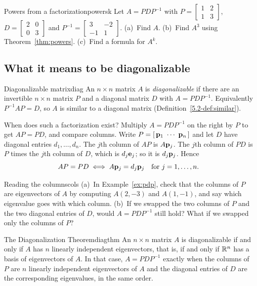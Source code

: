 \documentclass[11pt]{article}
\begin{document}
\begin{kc}{Powers from a factorization}{powersk}
Let $A=PDP^{-1}$ with $P=\begin{bmatrix}1&2\\1&3\end{bmatrix}$, $D=\begin{bmatrix}2&0\\0&3\end{bmatrix}$ and $P^{-1}=\begin{bmatrix}3&-2\\-1&1\end{bmatrix}$. (a)~Find $A$. (b)~Find $A^3$ using Theorem~\ref{thm:powers}. (c)~Find a formula for $A^k$.
\end{kc}

\subsection*{What it means to be diagonalizable}

\begin{defn}{Diagonalizable matrix}{diag}
An $n\times n$ matrix $A$ is \emph{diagonalizable} if there are an invertible $n\times n$ matrix $P$ and a diagonal matrix $D$ with $A=PDP^{-1}$. Equivalently $P^{-1}AP=D$, so $A$ is similar to a diagonal matrix (Definition~\ref{5.2-def:similar}).
\end{defn}

When does such a factorization exist? Multiply $A=PDP^{-1}$ on the right by $P$ to get $AP=PD$, and compare columns. Write $P=[\,\bv{p}_1\ \cdots\ \bv{p}_n\,]$ and let $D$ have diagonal entries $d_1,\dots,d_n$. The $j$th column of $AP$ is $A\mathbf{p}_j$. The $j$th column of $PD$ is $P$ times the $j$th column of $D$, which is $d_j\mathbf{e}_j$; so it is $d_j\mathbf{p}_j$. Hence
\[
AP=PD\iff A\mathbf{p}_j=d_j\mathbf{p}_j\quad\text{for }j=1,\dots,n.
\]

\begin{think}{Reading the columns}{cols}
(a)~In Example~\ref{ex:pdp}, check that the columns of $P$ are eigenvectors of $A$ by computing $A(2,-3)$ and $A(1,-1)$, and say which eigenvalue goes with which column. (b)~If we swapped the two columns of $P$ and the two diagonal entries of $D$, would $A=PDP^{-1}$ still hold? What if we swapped only the columns of $P$?
\end{think}

\begin{thm}{The Diagonalization Theorem}{diagthm}
An $n\times n$ matrix $A$ is diagonalizable if and only if $A$ has $n$ linearly independent eigenvectors, that is, if and only if $\mathbb{R}^n$ has a basis of eigenvectors of $A$. In that case, $A=PDP^{-1}$ exactly when the columns of $P$ are $n$ linearly independent eigenvectors of $A$ and the diagonal entries of $D$ are the corresponding eigenvalues, in the same order.
\end{thm}
\end{document}
